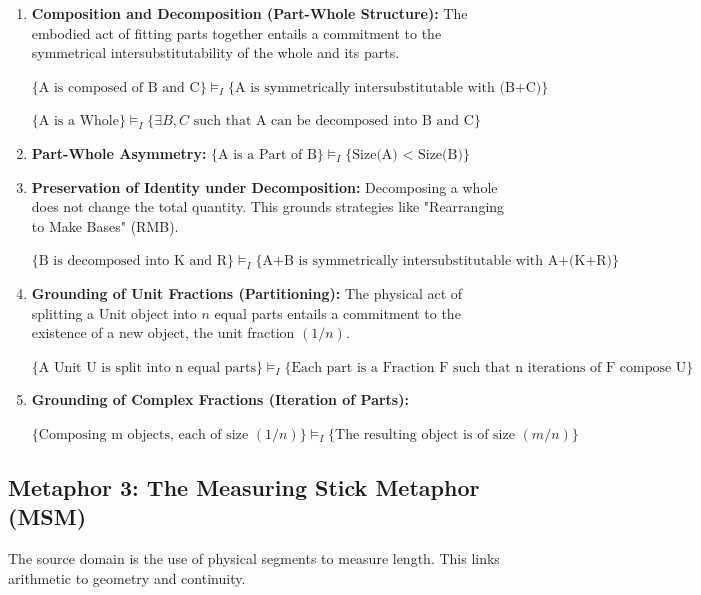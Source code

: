 \documentclass[12pt]{book}
\begin{document}
\begin{enumerate}
    \item \textbf{Composition and Decomposition (Part-Whole Structure):}
    The embodied act of fitting parts together entails a commitment to the symmetrical intersubstitutability of the whole and its parts.
    
    $\{\text{A is composed of B and C}\} \models_{I} \{\text{A is symmetrically intersubstitutable with (B+C)}\}$
    
    $\{\text{A is a Whole}\} \models_{I} \{\exists B, C \text{ such that A can be decomposed into B and C}\}$

    \item \textbf{Part-Whole Asymmetry:}
     $\{\text{A is a Part of B}\} \models_{I} \{\text{Size(A) < Size(B)}\}$

    \item \textbf{Preservation of Identity under Decomposition:}
    Decomposing a whole does not change the total quantity. This grounds strategies like "Rearranging to Make Bases" (RMB).
    
    $\{\text{B is decomposed into K and R}\} \models_{I} \{\text{A+B is symmetrically intersubstitutable with A+(K+R)}\}$

    \item \textbf{Grounding of Unit Fractions (Partitioning):}
    The physical act of splitting a Unit object into $n$ equal parts entails a commitment to the existence of a new object, the unit fraction $(1/n)$.
    
    $\{\text{A Unit U is split into n equal parts}\} \models_{I} \{\text{Each part is a Fraction F such that n iterations of F compose U}\}$

    \item \textbf{Grounding of Complex Fractions (Iteration of Parts):}
    
    $\{\text{Composing m objects, each of size }(1/n)\} \models_{I} \{\text{The resulting object is of size }(m/n)\}$

\end{enumerate}

\subsection{Metaphor 3: The Measuring Stick Metaphor (MSM)}

The source domain is the use of physical segments to measure length. This links arithmetic to geometry and continuity.
\end{document}
